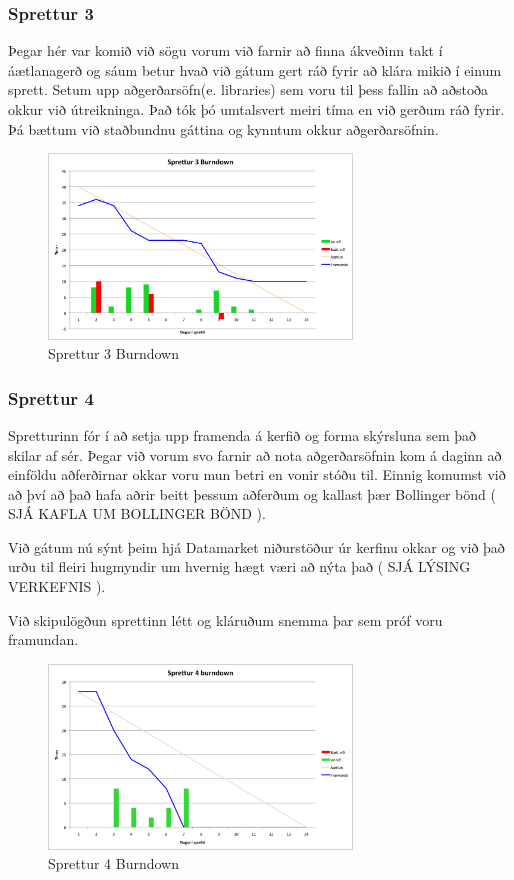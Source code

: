 \documentclass{article}
\begin{document}
\subsubsection{Sprettur 3}
Þegar hér var komið við sögu vorum við farnir að finna ákveðinn takt í áætlanagerð og sáum betur hvað við gátum gert ráð fyrir að klára mikið 
í einum sprett. Setum upp aðgerðarsöfn(e. libraries) sem voru til þess fallin að aðstoða okkur við útreikninga. Það tók þó umtalsvert meiri tíma en við gerðum
ráð fyrir. Þá bættum við staðbundnu gáttina og kynntum okkur aðgerðarsöfnin.
\begin{figure}[H]
 \centering
 \includegraphics[width=0.72\textwidth]{Sprettur3_Burndown.png}
 \caption{Sprettur 3 Burndown}
\end{figure}
\subsubsection{Sprettur 4}
Spretturinn fór í að setja upp framenda á kerfið og forma skýrsluna sem það skilar af sér. Þegar við vorum svo farnir að nota aðgerðarsöfnin 
kom á daginn að einföldu aðferðirnar okkar voru mun betri en vonir stóðu til. Einnig komumst við að því að það hafa aðrir beitt þessum aðferðum 
og kallast þær Bollinger bönd ( SJÁ KAFLA UM BOLLINGER BÖND ). 

Við gátum nú sýnt þeim hjá Datamarket niðurstöður úr kerfinu okkar og við það
urðu til fleiri hugmyndir um hvernig hægt væri að nýta það ( SJÁ LÝSING
VERKEFNIS ).

Við skipulögðun sprettinn létt og kláruðum snemma þar sem próf voru framundan.
\begin{figure}[H]
 \centering
 \includegraphics[width=0.72\textwidth]{Sprettur4_Burndown.png}
 \caption{Sprettur 4 Burndown}
\end{figure}
\end{document}

